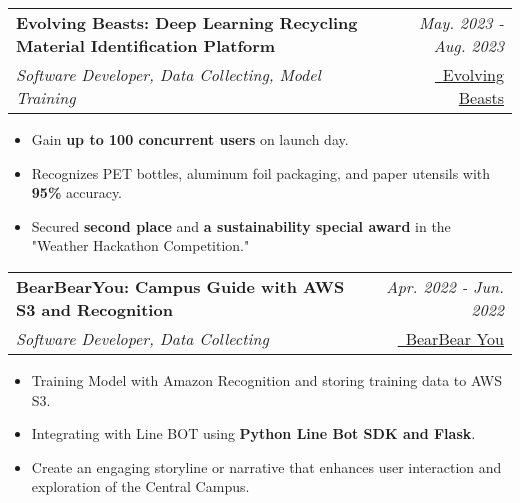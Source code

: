\documentclass[a4paper,11pt]{article}
\makeatletter
\newcommand{\resumeSubheading}[4]{
\vspace{0.5mm}\item
    \begin{tabular*}{0.98\textwidth}[t]{l@{\extracolsep{\fill}}r}
        \textbf{#1} & \textit{\footnotesize{#4}} \\
        \textit{\footnotesize{#3}} &  \footnotesize{#2}\\
    \end{tabular*}
    \vspace{-2.4mm}
}
\newcommand{\resumeItemListStart}{\begin{justify}\begin{itemize}[leftmargin=3ex, rightmargin=2ex, noitemsep,labelsep=1.2mm,itemsep=0mm]\small}
\newcommand{\resumeItemListEnd}{\end{itemize}\end{justify}\vspace{-2mm}}
\makeatother
\begin{document}
        \vspace{-2.0mm}
    
        \resumeSubheading
            { Evolving Beasts: Deep Learning Recycling Material Identification Platform} 
            {
                \href{https://github.com/1chooo/evolving-beasts}{\faGithub\ Evolving Beasts} 
            } %
            {Software Developer, Data Collecting, Model Training}%
            {May. 2023 - Aug. 2023} %
    
            \vspace{-1.0mm}
    
            \resumeItemListStart
                \item {Gain \textbf{up to 100 concurrent users} on launch day.}
                \item {Recognizes PET bottles, aluminum foil packaging, and paper utensils with \textbf{95\%} accuracy.}
                \item {Secured \textbf{second place} and \textbf{a sustainability special award} in the "Weather Hackathon Competition."}
            \resumeItemListEnd
            
            \vspace{-2.0mm}
            
        \resumeSubheading
            { BearBearYou: Campus Guide with AWS S3 and Recognition} 
            {
            \href{https://github.com/1chooo/bear-bear}{\faGithub\ BearBear You} 
            } %
            {Software Developer, Data Collecting}%
            {Apr. 2022 - Jun. 2022} %
            
            \vspace{-1.0mm}
            
            \resumeItemListStart
                \item {Training Model with Amazon Recognition and storing training data to AWS S3.}
                \item {Integrating with Line BOT using \textbf{Python Line Bot SDK and Flask}.}
                \item {Create an engaging storyline or narrative that enhances user interaction and exploration of the Central Campus.}
            \resumeItemListEnd
            
\end{document}
